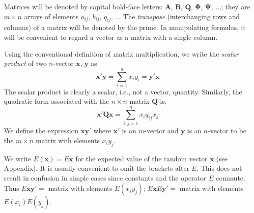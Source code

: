 \documentclass{article}
\begin{document}
Matrices will be denoted by capital bold-face letters: $\mathbf{A}$, $\mathbf{B}$, $\mathbf{Q}$, $\boldsymbol{\Phi}$, $\boldsymbol{\Psi}$, $\dotsc$; they are $m \times n$ arrays of elements $a_{ij}$, $b_{ij}$, $q_{ij}$, $\dotsc$ The \emph{transpose} (interchanging rows and columns) of a matrix will be denoted by the prime. In manipulating formulas, it will be convenient to regard a vector as a matrix with a single column.

Using the conventional definition of matrix multiplication, we write the \emph{scalar product} of two $n$-vector $\mathbf{x}$, $\mathbf{y}$ as
\begin{equation*}
\mathbf{x'y}=\sum^n_{i=1}x_iy_i=\mathbf{y'x}
\end{equation*}
The scalar product is clearly a scalar, i.e., not a vector, quantity. Similarly, the quadratic form associated with the $n \times n$ matrix $\mathbf{Q}$ is,
\begin{equation*}
\mathbf{x'Qx}=\sum^n_{i,j=1}x_i q_{ij} x_j
\end{equation*}
We define the expression $\mathbf{xy'}$ where $\mathbf{x'}$ is an $m$-vector and $\mathbf{y}$ is an $n$-vector to be the $m \times n$ matrix with elements $x_i y_j$.

We write $E(\mathbf{x}) = E\mathbf{x}$ for the expected value of the random vector $\mathbf{x}$ (see Appendix). It is usually convenient to omit the brackets after $E$. This does not result in confusion in simple cases since constants and the operator $E$ commute. Thus $E\mathbf{xy'} =$ matrix with elements $E(x_i y_j)$; $E\mathbf{x}E\mathbf{y'} =$ matrix with elements $E(x_i)E(y_j)$.
\end{document}
